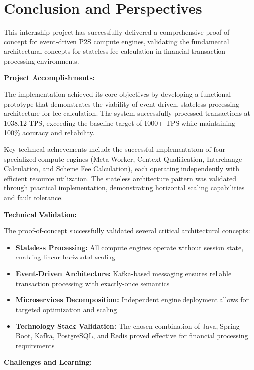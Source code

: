 \section*{Conclusion and Perspectives}

This internship project has successfully delivered a comprehensive proof-of-concept for event-driven P2S compute engines, validating the fundamental architectural concepts for stateless fee calculation in financial transaction processing environments.

\textbf{Project Accomplishments:}

The implementation achieved its core objectives by developing a functional prototype that demonstrates the viability of event-driven, stateless processing architecture for fee calculation. The system successfully processed transactions at 1038.12 TPS, exceeding the baseline target of 1000+ TPS while maintaining 100\% accuracy and reliability.

Key technical achievements include the successful implementation of four specialized compute engines (Meta Worker, Context Qualification, Interchange Calculation, and Scheme Fee Calculation), each operating independently with efficient resource utilization. The stateless architecture pattern was validated through practical implementation, demonstrating horizontal scaling capabilities and fault tolerance.

\textbf{Technical Validation:}

The proof-of-concept successfully validated several critical architectural concepts:
\begin{itemize}
    \item \textbf{Stateless Processing:} All compute engines operate without session state, enabling linear horizontal scaling
    \item \textbf{Event-Driven Architecture:} Kafka-based messaging ensures reliable transaction processing with exactly-once semantics
    \item \textbf{Microservices Decomposition:} Independent engine deployment allows for targeted optimization and scaling
    \item \textbf{Technology Stack Validation:} The chosen combination of Java, Spring Boot, Kafka, PostgreSQL, and Redis proved effective for financial processing requirements
\end{itemize}

\textbf{Challenges and Learning:}

